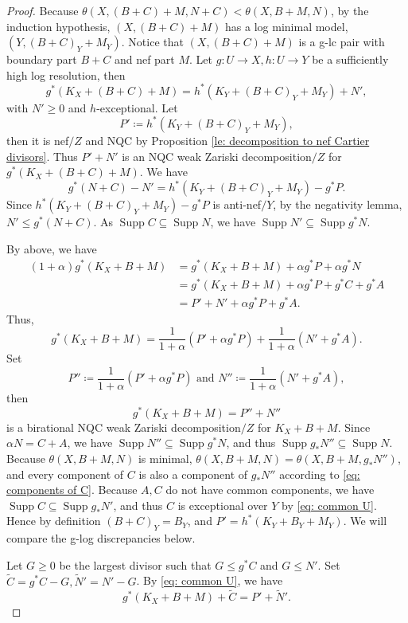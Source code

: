 \documentclass[11pt]{amsart}
\newcommand{\Supp}{\operatorname{Supp}}
\begin{document}
\begin{proof}
	Because $\theta(X, (B+C)+M,N+C)<\theta(X, B+M,N)$, by the induction hypothesis, $(X, (B+C)+M)$ has a log minimal model, $(Y,(B+C)_Y+M_Y)$. Notice that $(X, (B+C)+M)$ is a g-lc pair with boundary part $B+C$ and nef part $M$. Let $g: U \to X, h: U \to Y$ be a sufficiently high log resolution, then
	\begin{equation}\label{eq: common U}
	g^*(K_X+(B+C)+M)=h^*(K_Y+ (B+C)_Y+M_Y)+N',
	\end{equation} with $N' \geq 0$ and $h$-exceptional.
	Let 
	\[
	P' \coloneqq  h^*(K_Y+ (B+C)_Y+M_Y),
	\] then it is nef$/Z$ and NQC by Proposition \ref{le: decomposition to nef Cartier divisors}. Thus $P'+N'$ is an NQC weak Zariski decomposition$/Z$ for $g^*(K_X+(B+C)+M)$. We have
	\[
	g^{*}(N+C)-N'=h^{*}(K_Y+ (B+C)_Y+M_Y)-g^{*}P.
	\]
	Since $h^{*}(K_Y+ (B+C)_Y+M_Y)-g^{*}P$ is anti-nef$/Y$, by the negativity lemma, $N' \leq g^*(N+C)$. As $\Supp C \subseteq \Supp N$, we have $\Supp N'\subseteq \Supp g^{*}N$. 
	
	By above, we have
	\[
	\begin{split}
	(1+\alpha)g^*(K_X+B+M) &= g^*(K_X+B+M)+\alpha g^*P+\alpha g^*N\\
	&=g^*(K_X+B+M)+\alpha g^*P+ g^*C+ g^*A\\
	& = P'+N'+\alpha g^*P+ g^*A.
	\end{split}
	\] 
	Thus,
	\[g^*(K_X+B+M) = \frac{1}{1+\alpha}(P'+\alpha g^*P)+\frac{1}{1+\alpha}(N'+g^*A).\]
	Set 
	\[
	P'' \coloneqq  \frac{1}{1+\alpha}(P'+\alpha g^*P) \text{~and~} N''\coloneqq \frac{1}{1+\alpha}(N'+g^*A),
	\] then
	\[
	g^*(K_X+B+M)=P''+N''
	\]
	is a birational NQC weak Zariski decomposition$/Z$ for $K_X+B+M$. Since $\alpha N=C+A$, we have $\Supp N'' \subseteq \Supp g^*N$, and thus $\Supp g_* N'' \subseteq \Supp N$. Because $\theta(X, B+M,N)$ is minimal, $\theta(X, B+M,N) = \theta(X, B+M,g_{*}N'')$, and every component of $C$ is also a component of $g_*N''$ according to \eqref{eq: components of C}. Because $A, C$ do not have common components, we have $\Supp C \subseteq \Supp g_*N'$, and thus $C$ is exceptional over $Y$ by \eqref{eq: common U}. Hence by definition $(B+C)_Y=B_Y$, and $P' = h^*(K_Y+B_Y+M_Y)$. We will compare the g-log discrepancies below.
	
	Let $G \geq 0$ be the largest divisor such that $G \leq g^{*}C$ and $G \leq N'$. Set $\tilde C = g^{*}C-G, \tilde N' = N' -G$. By \eqref{eq: common U}, we have 
	\begin{equation}\label{eq: tilde C}
	g^*(K_X+B+M)+\tilde C = P'+\tilde N'.
	\end{equation}
	

\end{proof}
\end{document}
